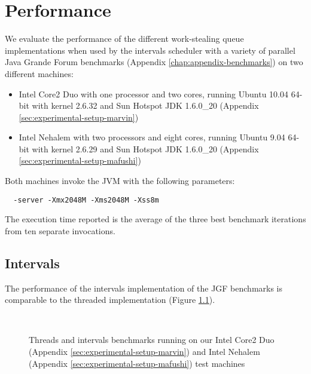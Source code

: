 
\chapter{Performance}
\label{chap:queues-performance}

We evaluate the performance of the different work-stealing queue
implementations when used by the intervals scheduler with a variety of
parallel Java Grande Forum benchmarks (Appendix
\ref{chap:appendix-benchmarks}) on two different machines:

\begin{itemize}
\item Intel Core2 Duo with one processor and two cores, running Ubuntu
  10.04 64-bit with kernel 2.6.32 and Sun Hotspot JDK 1.6.0\_20
  (Appendix \ref{sec:experimental-setup-marvin})
\item Intel Nehalem with two processors and eight cores, running
  Ubuntu 9.04 64-bit with kernel 2.6.29 and Sun Hotspot JDK 1.6.0\_20
  (Appendix \ref{sec:experimental-setup-mafushi})
\end{itemize}

Both machines invoke the JVM with the following parameters:

\begin{lstlisting}
  -server -Xmx2048M -Xms2048M -Xss8m
\end{lstlisting}

The execution time reported is the average of the three best benchmark
iterations from ten separate invocations.


\section{Intervals}
\label{sec:queues-performance-intervals}

The performance of the intervals implementation of the JGF benchmarks
is comparable to the threaded implementation (Figure
\ref{fig:queues-performance-threads}).

\begin{figure}[!ht]
  \centering
  \\
  \caption[Threads and intervals benchmark results]{Threads and
    intervals benchmarks running on our Intel Core2 Duo (Appendix
    \ref{sec:experimental-setup-marvin}) and Intel Nehalem (Appendix
    \ref{sec:experimental-setup-mafushi}) test machines}
  \label{fig:queues-performance-threads}
\end{figure}

